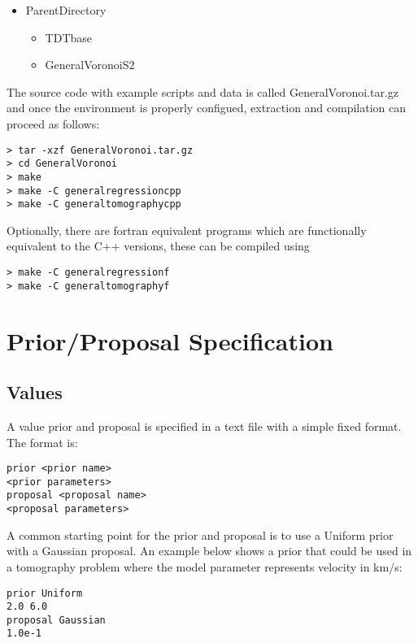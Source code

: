 \documentclass{article}
\begin{document}
\begin{itemize}
\item ParentDirectory
  \begin{itemize}
  \item TDTbase
  \item GeneralVoronoiS2
  \end{itemize}
\end{itemize}

The source code with example scripts and data is called
GeneralVoronoi.tar.gz and once the environment is properly
configued, extraction and compilation can proceed as follows:

\begin{verbatim}
> tar -xzf GeneralVoronoi.tar.gz
> cd GeneralVoronoi
> make
> make -C generalregressioncpp
> make -C generaltomographycpp
\end{verbatim}

Optionally, there are fortran equivalent programs which are
functionally equivalent to the C++ versions, these can
be compiled using

\begin{verbatim}
> make -C generalregressionf
> make -C generaltomographyf
\end{verbatim}

\section{Prior/Proposal Specification}

\subsection{Values}

A value prior and proposal is specified in a text file with a simple
fixed format.  The format is:

\begin{verbatim}
prior <prior name>
<prior parameters>
proposal <proposal name>
<proposal parameters>
\end{verbatim}

A common starting point for the prior and proposal is to use
a Uniform prior with a Gaussian proposal. An example below shows
a prior that could be used in a tomography problem where the model
parameter represents velocity in km/s:

\begin{verbatim}
prior Uniform
2.0 6.0
proposal Gaussian
1.0e-1
\end{verbatim}
\end{document}
